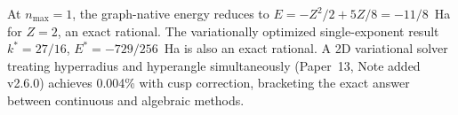 \documentclass[aps,pra,twocolumn,superscriptaddress,longbibliography]{revtex4-2}
\begin{document}
At $n_{\max} = 1$, the graph-native energy reduces to
$E = -Z^2/2 + 5Z/8 = -11/8$~Ha for $Z = 2$, an exact rational.
The variationally optimized single-exponent result $k^* = 27/16$,
$E^* = -729/256$~Ha is also an exact rational.
A 2D variational solver treating hyperradius and hyperangle
simultaneously (Paper~13, Note added v2.6.0) achieves 0.004\% with
cusp correction, bracketing the exact answer between continuous and
algebraic methods.
\end{document}
